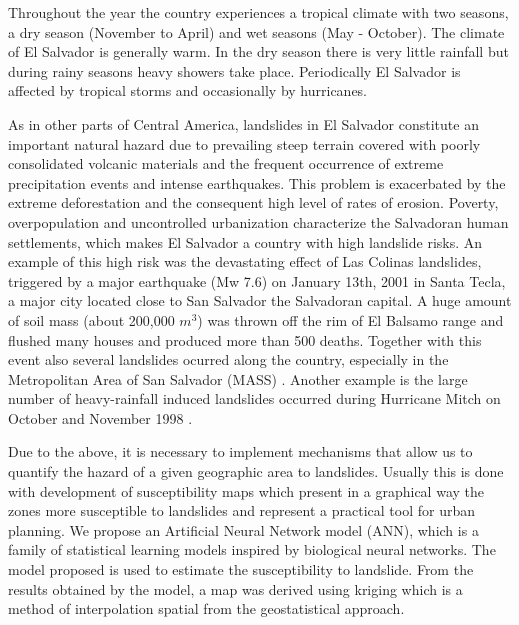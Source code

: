 \documentclass[11pt,twoside]{rmta2010esp}%
\begin{document}
Throughout the year the country experiences a tropical climate with two seasons, a dry season (November to April) and wet seasons (May - October). The climate of El Salvador is generally warm. In the dry season there is very little rainfall but during rainy seasons heavy showers take place. Periodically El Salvador is affected by tropical storms and occasionally by hurricanes.

As in other parts of Central America, landslides in El Salvador constitute an important natural hazard due to prevailing steep terrain covered with poorly consolidated volcanic materials and the frequent occurrence of extreme precipitation events and intense earthquakes. This problem is exacerbated by the extreme deforestation and the consequent high level of rates of erosion. Poverty, overpopulation and uncontrolled urbanization characterize the Salvadoran human settlements, which makes El Salvador a country with high landslide risks. An example of this high risk was the devastating effect of Las Colinas landslides,  triggered by a major earthquake (Mw 7.6) on January 13th, 2001 in Santa Tecla, a major city located close to San Salvador the Salvadoran capital\cite{evans}. A huge amount of soil mass (about 200,000 $m^{3}$) was thrown off the rim of El Balsamo range and flushed many houses and produced more than 500 deaths. Together with this event also several landslides ocurred along the country, especially in the Metropolitan Area of San Salvador (MASS) \cite{jibson}. Another example is the large number of heavy-rainfall induced landslides occurred during Hurricane Mitch on October and November 1998 \cite{crone}.   

Due to the above, it is necessary to implement mechanisms that allow us to quantify the hazard of a given geographic area to landslides. Usually this is done with development of susceptibility maps which present in a graphical way the zones more susceptible to landslides and represent a practical tool for urban planning. We propose an Artificial Neural Network model (ANN), which is a family of statistical learning models inspired by biological neural networks. The model proposed is used to estimate the susceptibility to landslide. From the results obtained by the model, a map was derived using kriging which is a method of interpolation spatial from the geostatistical approach. 
\end{document}
